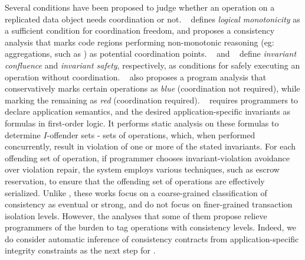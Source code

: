 Several conditions have been proposed to judge whether an operation on a
replicated data object needs coordination or not. ~\cite{Calm} defines
\emph{logical monotonicity} as a sufficient condition for coordination freedom,
and proposes a consistency analysis that marks code regions performing
non-monotonic reasoning (eg: aggregations, such as ) as potential
coordination points. ~\cite{IConfluence} and ~\cite{Sieve} define
\emph{invariant confluence} and \emph{invariant safety}, respectively, as
conditions for safely executing an operation without coordination.
~\cite{Sieve} also proposes a program analysis that conservatively marks certain
operations as \emph{blue} (coordination not required), while marking the
remaining as \emph{red} (coordination required). ~\cite{indigo} requires
programmers to declare application semantics, and the desired
application-specific invariants as formulas in first-order logic. It performs
static analysis on these formulas to determine $I$-offender sets - sets of
operations, which, when performed concurrently, result in violation of one or
more of the stated invariants. For each offending set of operation, if
programmer chooses invariant-violation avoidance over violation repair, the
system employs various techniques, such as escrow reservation, to ensure that
the offending set of operations are effectively serialized. Unlike \name, these
works focus on a coarse-grained classification of consistency as eventual or
strong, and do not focus on finer-grained transaction isolation levels. However,
the analyses that some of them propose relieve programmers of the burden to tag
operations with consistency levels. Indeed, we do consider automatic inference
of consistency contracts from application-specific integrity constraints as the
next step for \name.
